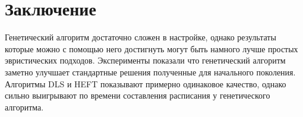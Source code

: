\chapter*{Заключение}




\begin{spacing}{1.3}
Генетический алгоритм достаточно сложен в настройке, однако результаты которые можно с помощью него достигнуть могут быть намного лучше простых эвристических подходов. Эксперименты показали что генетический алгоритм заметно улучшает стандартные решения полученные для начального поколения.  Алгоритмы DLS и HEFT показывают примерно одинаковое качество, однако сильно выигрывают по времени составления расписания у генетического алгоритма.
\end{spacing}

